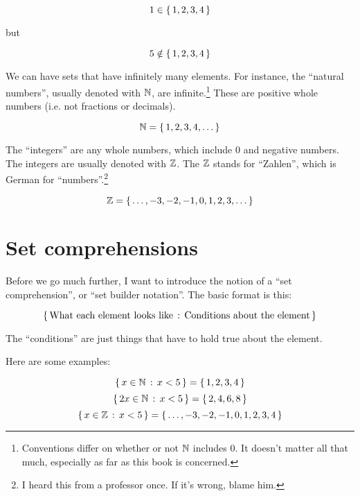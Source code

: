 \begin{displaymath}
  1 \in \left\{ \, 1,2,3,4 \, \right\}
\end{displaymath}

but 

\begin{displaymath}
  5 \notin \left\{ \, 1,2,3,4 \, \right\}
\end{displaymath}

We can have sets that have infinitely many elements. For instance, the
``natural numbers'', usually denoted with $\mathbb{N}$, are
infinite.\footnote{Conventions differ on whether or not $\mathbb{N}$ includes
  $0$. It doesn't matter all that much, especially as far as this book
  is concerned.} These are positive whole numbers (i.e. not fractions
or decimals).

\begin{displaymath}
  \mathbb{N} = \left\{ \, 1,2,3,4,\dots \, \right\}
\end{displaymath}

The ``integers'' are any whole numbers, which include $0$ and negative
numbers. The integers are usually denoted with $\mathbb{Z}$. The $\mathbb{Z}$ stands
for ``Zahlen'', which is German for ``numbers''.\footnote{I heard this
  from a professor once. If it's wrong, blame him.}

\begin{displaymath}
  \mathbb{Z} = \left\{ \, \dots, -3, -2, -1, 0, 1, 2, 3, \dots \, \right\}
\end{displaymath}

\section{Set comprehensions}

Before we go much further, I want to introduce the notion of a ``set
comprehension'', or ``set builder notation''. The basic format is this:

\begin{displaymath}
  \left\{ \,  \text{What each element looks like} \, : \, \text{Conditions about the element}  \, \right\}
\end{displaymath}

The ``conditions'' are just things that have to hold true about the
element.

Here are some examples:

\begin{displaymath}
  \left\{ \,  x \in \mathbb{N} \, : \, x < 5  \, \right\} = \left\{ \, 1,2,3,4 \, \right\}
\end{displaymath}
\begin{displaymath}
  \left\{ \,  2x \in \mathbb{N} \, : \, x < 5  \, \right\} = \left\{ \, 2,4,6,8 \, \right\}
\end{displaymath}
\begin{displaymath}
  \left\{ \,  x \in \mathbb{Z} \, : \, x < 5  \, \right\} = \left\{ \, \dots,-3,-2,-1,0,1,2,3,4 \, \right\}
\end{displaymath}

